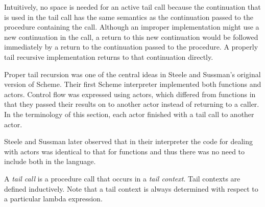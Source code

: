 \begin{rationale}

Intuitively, no space is needed for an active tail call because the
continuation that is used in the tail call has the same semantics as the
continuation passed to the procedure containing the call.  Although an improper
implementation might use a new continuation in the call, a return
to this new continuation would be followed immediately by a return
to the continuation passed to the procedure.  A properly tail recursive
implementation returns to that continuation directly.

Proper tail recursion was one of the central ideas in Steele and
Sussman's original version of Scheme.  Their first Scheme interpreter
implemented both functions and actors.  Control flow was expressed using
actors, which differed from functions in that they passed their results
on to another actor instead of returning to a caller.  In the terminology
of this section, each actor finished with a tail call to another actor.

Steele and Sussman later observed that in their interpreter the code
for dealing with actors was identical to that for functions and thus
there was no need to include both in the language.

\end{rationale}

A {\em tail call} is a procedure call that occurs
in a {\em tail context}.  Tail contexts are defined inductively.  Note
that a tail context is always determined with respect to a particular lambda
expression.

